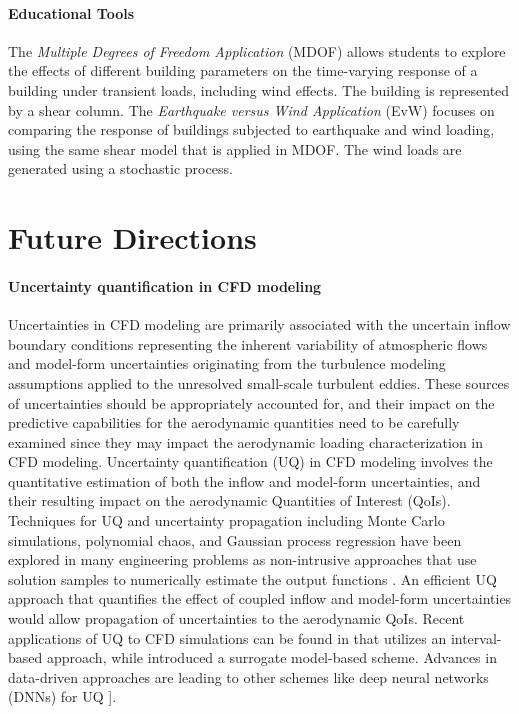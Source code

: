 \paragraph{Educational Tools} The \emph{Multiple Degrees of Freedom Application} (MDOF) allows students to explore the effects of different building parameters on the time-varying response of a building under transient loads, including wind effects. The building is represented by a shear column. The \emph{Earthquake versus Wind Application} (EvW) focuses on comparing the response of buildings subjected to earthquake and wind loading, using the same shear model that is applied in MDOF. The wind loads are generated using a stochastic process.


\section{Future Directions}
\label{sec:resp_cfd_wind_flow_future}

\paragraph{Uncertainty quantification in CFD modeling} Uncertainties in CFD modeling are primarily associated with the uncertain inflow boundary conditions representing the inherent variability of atmospheric flows and model-form uncertainties originating from the turbulence modeling assumptions applied to the unresolved small-scale turbulent eddies. These sources of uncertainties should be appropriately accounted for, and their impact on the predictive capabilities for the aerodynamic quantities need to be carefully examined since they may impact the aerodynamic loading characterization in CFD modeling. Uncertainty quantification (UQ) in CFD modeling involves the quantitative estimation of both the inflow and model-form uncertainties, and their resulting impact on the aerodynamic Quantities of Interest (QoIs). Techniques for UQ and uncertainty propagation including Monte Carlo simulations, polynomial chaos, and Gaussian process regression have been explored in many engineering problems as non-intrusive approaches that use solution samples to numerically estimate the output functions \citep{beran2017uncertainty}. An efficient UQ approach that quantifies the effect of coupled inflow and model-form uncertainties would allow propagation of uncertainties to the aerodynamic QoIs. Recent applications of UQ to CFD simulations can be found in \citep{gorle2015quantifying} that utilizes an interval-based approach, while \citep{ding2019inflow} introduced a surrogate model-based scheme. Advances in data-driven approaches are leading to other schemes like deep neural networks (DNNs) for UQ  \citep[e.g.,][]{ling2016reynolds, luo2019deep}].

